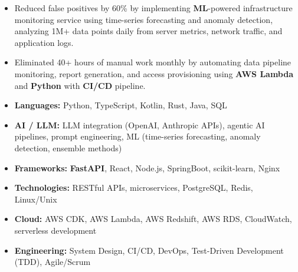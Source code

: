 \documentclass[10pt,a4paper]{article}
\begin{document}
\begin{itemize}[topsep=0pt]
  \item Reduced false positives by 60\% by implementing \textbf{ML}-powered infrastructure monitoring service using time-series forecasting and anomaly detection, analyzing 1M+ data points daily from server metrics, network traffic, and application logs.
  \item Eliminated 40+ hours of manual work monthly by automating data pipeline monitoring, report generation, and access provisioning using \textbf{AWS Lambda} and \textbf{Python} with \textbf{CI/CD} pipeline.
\end{itemize}
\vspace{0.15em}


\vspace{0.15em}

\begin{itemize}[leftmargin=16pt,topsep=0pt,itemsep=0.6pt]
  \item \textbf{Languages:} Python, TypeScript, Kotlin, Rust, Java, SQL
  \item \textbf{AI / LLM:} LLM integration (OpenAI, Anthropic APIs), agentic AI pipelines, prompt engineering, ML (time-series forecasting, anomaly detection, ensemble methods)
  \item \textbf{Frameworks:} \textbf{FastAPI}, React, Node.js, SpringBoot, scikit-learn, Nginx
  \item \textbf{Technologies:} RESTful APIs, microservices, PostgreSQL, Redis, Linux/Unix
  \item \textbf{Cloud:} AWS CDK, AWS Lambda, AWS Redshift, AWS RDS, CloudWatch, serverless development
  \item \textbf{Engineering:} System Design, CI/CD, DevOps, Test-Driven Development (TDD), Agile/Scrum
\end{itemize}
\vspace{0.15em}




\end{document}
